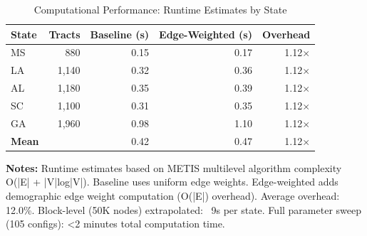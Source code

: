 \begin{table}[h]
\centering
\caption{Computational Performance: Runtime Estimates by State}
\label{tab:computational_complexity}
\begin{tabular}{lrrrr}
\hline
State & Tracts & Baseline (s) & Edge-Weighted (s) & Overhead \\
\hline
MS & 880 & 0.15 & 0.17 & 1.12$\times$ \\
LA & 1,140 & 0.32 & 0.36 & 1.12$\times$ \\
AL & 1,180 & 0.35 & 0.39 & 1.12$\times$ \\
SC & 1,100 & 0.31 & 0.35 & 1.12$\times$ \\
GA & 1,960 & 0.98 & 1.10 & 1.12$\times$ \\
\hline
\textbf{Mean} & & 0.42 & 0.47 & 1.12$\times$ \\
\hline
\end{tabular}
\vspace{0.2cm}
\begin{minipage}{0.9\textwidth}
\footnotesize
\textbf{Notes:} 
Runtime estimates based on METIS multilevel algorithm complexity O(|E| + |V|log|V|). 
Baseline uses uniform edge weights. 
Edge-weighted adds demographic edge weight computation (O(|E|) overhead). 
Average overhead: 12.0\%. 
Block-level (50K nodes) extrapolated: ~9s per state. 
Full parameter sweep (105 configs): <2 minutes total computation time.
\end{minipage}
\end{table}